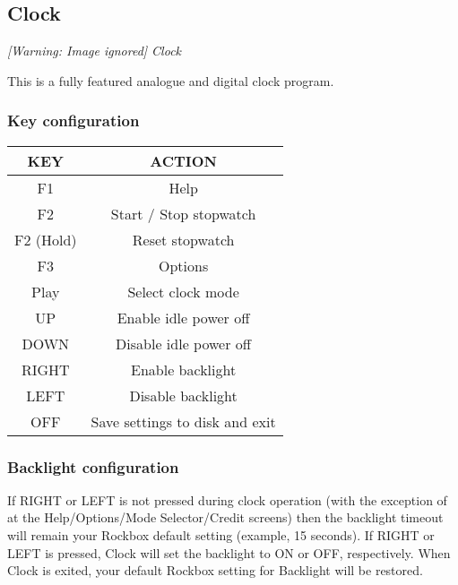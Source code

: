 \subsection{Clock}
{\centering\itshape
  [Warning: Image ignored] %
 \newline
Clock
\par}

This is a fully featured analogue and digital clock program.  

\subsubsection{Key configuration}

\begin{table}[h!]
\begin{center}
\begin{tabular}{|c|c|}
\hline
KEY & ACTION \\\hline
F1 & Help \\\hline
F2 & Start / Stop stopwatch \\\hline
F2 (Hold) & Reset stopwatch \\\hline
F3 & Options \\\hline
Play & Select clock mode \\\hline
UP & Enable idle power off \\\hline
DOWN & Disable idle power off \\\hline
RIGHT & Enable backlight \\\hline
LEFT & Disable backlight \\\hline
OFF & Save settings to disk and exit \\\hline
\end{tabular}
\end{center}
\end{table}

\subsubsection{Backlight configuration}
If RIGHT or LEFT is not pressed during clock operation (with the
exception of at the Help/Options/Mode Selector/Credit screens) then the
backlight timeout will remain your Rockbox default setting (example, 15
seconds). If RIGHT or LEFT is pressed, Clock will set the backlight to
ON or OFF, respectively. When Clock is exited, your default Rockbox
setting for Backlight will be restored. 

